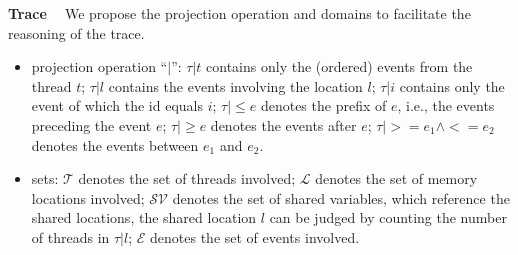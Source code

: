 {\bf Trace \ } 
We propose the projection operation and domains to facilitate the reasoning of the trace.
\begin{itemize}
\item projection operation  ``$|$'': $\tau|t$ contains only the (ordered) events from the thread $t$; $\tau|l$ contains the events involving the location $l$; $\tau|i$ contains only the event of which the id equals $i$; $\tau|\leq e$ denotes the prefix of $e$, i.e., the events preceding the event $e$; $\tau|\geq e$ denotes the events after $e$; $\tau|>=e_1\wedge <=e_2$ denotes the events between $e_1$ and $e_2$.
\item sets: $\mathcal{T}$ denotes the set of threads involved;  $\mathcal{L}$ denotes the set of memory locations involved; 
$\mathcal{SV}$ denotes the set of shared variables, which reference the shared locations, the shared location $l$ can be judged by counting the number of threads in $\tau|l$;  $\mathcal{E}$ denotes the set of events involved.
\end{itemize}









